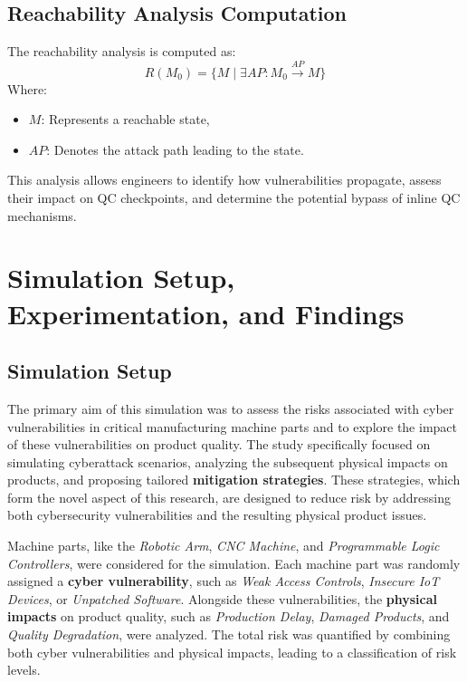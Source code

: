 \documentclass[conference]{IEEEtran}
\begin{document}
\subsection{Reachability Analysis Computation}
The reachability analysis is computed as:
\begin{equation}
    R(M_0) = \{ M \mid \exists AP : M_0 \xrightarrow{AP} M \}
\end{equation}
Where:
\begin{itemize}
    \item $M$: Represents a reachable state,
    \item $AP$: Denotes the attack path leading to the state.
\end{itemize}

This analysis allows engineers to identify how vulnerabilities propagate, assess their impact on QC checkpoints, and determine the potential bypass of inline QC mechanisms.


\section{Simulation Setup, Experimentation, and Findings}

\subsection{Simulation Setup}
The primary aim of this simulation was to assess the risks associated with cyber vulnerabilities in critical manufacturing machine parts and to explore the impact of these vulnerabilities on product quality. The study specifically focused on simulating cyberattack scenarios, analyzing the subsequent physical impacts on products, and proposing tailored \textbf{mitigation strategies}. These strategies, which form the novel aspect of this research, are designed to reduce risk by addressing both cybersecurity vulnerabilities and the resulting physical product issues. 

Machine parts, like the \textit{Robotic Arm}, \textit{CNC Machine}, and \textit{Programmable Logic Controllers}, were considered for the simulation. Each machine part was randomly assigned a \textbf{cyber vulnerability}, such as \textit{Weak Access Controls}, \textit{Insecure IoT Devices}, or \textit{Unpatched Software}. Alongside these vulnerabilities, the \textbf{physical impacts} on product quality, such as \textit{Production Delay}, \textit{Damaged Products}, and \textit{Quality Degradation}, were analyzed. The total risk was quantified by combining both cyber vulnerabilities and physical impacts, leading to a classification of risk levels.
\end{document}
